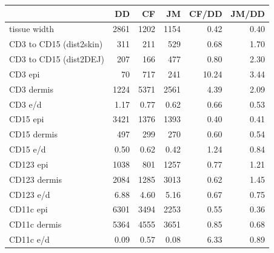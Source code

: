 \begin{tabular}{lrrrrr}
   \hline  &DD& CF& JM& CF/DD& JM/DD\\ 
\hline
tissue width & 2861 & 1202 & 1154 &  0.42 & 0.40 \\ 
  CD3 to CD15 (dist2skin) & 311 & 211 & 529 &  0.68 & 1.70 \\ 
  CD3 to CD15 (dist2DEJ) & 207 & 166 & 477 &  0.80 & 2.30 \\ 
   \hline
CD3 epi & 70 & 717 & 241 & 10.24 & 3.44 \\ 
  CD3 dermis & 1224 & 5371 & 2561 &  4.39 & 2.09 \\ 
  CD3 e/d & 1.17 & 0.77 & 0.62 &  0.66 & 0.53 \\ 
   \hline
CD15 epi & 3421 & 1376 & 1393 &  0.40 & 0.41 \\ 
  CD15 dermis & 497 & 299 & 270 &  0.60 & 0.54 \\ 
  CD15 e/d & 0.50 & 0.62 & 0.42 &  1.24 & 0.84 \\ 
   \hline
CD123 epi & 1038 & 801 & 1257 &  0.77 & 1.21 \\ 
  CD123 dermis & 2084 & 1285 & 3013 &  0.62 & 1.45 \\ 
  CD123 e/d & 6.88 & 4.60 & 5.16 &  0.67 & 0.75 \\ 
   \hline
CD11c epi & 6301 & 3494 & 2253 &  0.55 & 0.36 \\ 
  CD11c dermis & 5364 & 4555 & 3651 &  0.85 & 0.68 \\ 
  CD11c e/d & 0.09 & 0.57 & 0.08 &  6.33 & 0.89 \\ 
   \hline
\end{tabular}
